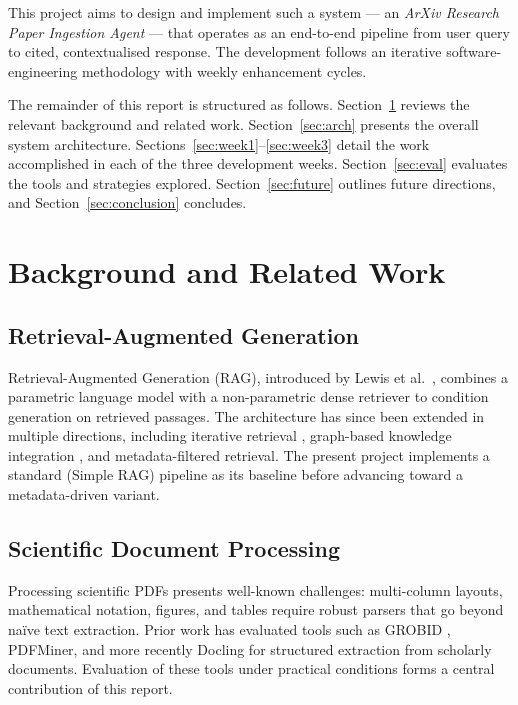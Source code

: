 \documentclass[12pt, a4paper]{article}
\begin{document}
This project aims to design and implement such a system --- an
\emph{ArXiv Research Paper Ingestion Agent} --- that operates as an
end-to-end pipeline from user query to cited, contextualised response.
The development follows an iterative software-engineering methodology
with weekly enhancement cycles.

The remainder of this report is structured as follows. Section~\ref{sec:background}
reviews the relevant background and related work. Section~\ref{sec:arch}
presents the overall system architecture. Sections~\ref{sec:week1}--\ref{sec:week3}
detail the work accomplished in each of the three development weeks.
Section~\ref{sec:eval} evaluates the tools and strategies explored.
Section~\ref{sec:future} outlines future directions, and
Section~\ref{sec:conclusion} concludes.

\section{Background and Related Work}
\label{sec:background}

\subsection{Retrieval-Augmented Generation}

Retrieval-Augmented Generation (RAG), introduced by Lewis et al.\
\cite{lewis2020rag}, combines a parametric language model with a
non-parametric dense retriever to condition generation on retrieved
passages. The architecture has since been extended in multiple directions,
including iterative retrieval \cite{shi2024iter}, graph-based
knowledge integration \cite{edge2024graphrag}, and
metadata-filtered retrieval. The present project implements a standard
(Simple RAG) pipeline as its baseline before advancing toward a
metadata-driven variant.

\subsection{Scientific Document Processing}

Processing scientific PDFs presents well-known challenges: multi-column
layouts, mathematical notation, figures, and tables require robust parsers
that go beyond na\"{i}ve text extraction. Prior work has evaluated tools
such as GROBID \cite{lopez2009grobid}, PDFMiner, and more recently
Docling \cite{docling2024} for structured extraction from scholarly
documents. Evaluation of these tools under practical conditions forms a
central contribution of this report.
\end{document}
